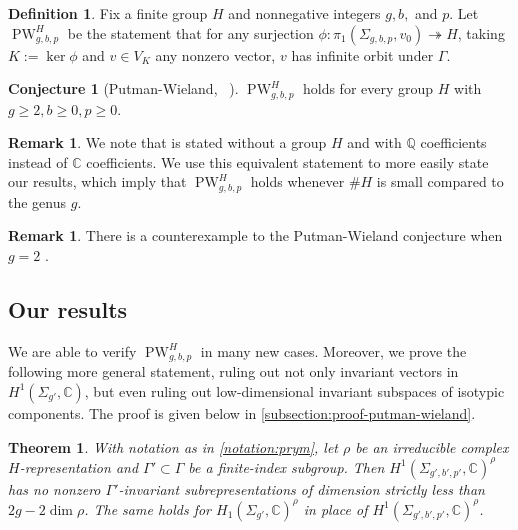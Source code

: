 \documentclass[12 pt]{amsart}
\theoremstyle{plain}
\newtheorem{theorem}[subsubsection]{Theorem}
\theoremstyle{definition}
\newtheorem{definition}[subsubsection]{Definition}
\newtheorem{remark}[subsubsection]{Remark}
\newtheorem{conjecture}[subsubsection]{Conjecture}
\theoremstyle{remark}
\numberwithin{equation}{section}
\DeclareMathOperator\PW{PW}
\begin{document}
\begin{definition}
	\label{definition:pw}
	Fix a finite group $H$ and nonnegative integers $g, b,$ and $p$.
	Let $\PW_{g,b,p}^H$ be the statement that for any
	surjection $\phi: \pi_1(\Sigma_{g,b,p}, v_0) \twoheadrightarrow
	H$, taking $K := \ker \phi$ and $v \in V_K$ any nonzero vector,
	$v$ has infinite orbit under $\Gamma$.
\end{definition}

\begin{conjecture}[Putman-Wieland, ~]
	\label{conjecture:putman-wieland}
	$\PW_{g,b,p}^H$ holds for every group $H$ with $g \geq 2, b \geq 0, p \geq 0$.
\end{conjecture}

\begin{remark}
\label{remark:putman-wieland-differences}
We note that 
\cite[Conjecture 1.2]{putmanW:abelian-quotients}
is stated without a group $H$ and with $\mathbb Q$ coefficients instead of
$\mathbb C$ coefficients.
We use this equivalent statement to more easily state our results,
which imply that 
$\PW_{g,b,p}^H$ holds whenever $\# H$ is small compared to the genus $g$. 
\end{remark}
\begin{remark}
	\label{remark:}
	There is a counterexample to the Putman-Wieland conjecture when $g = 2$ \cite[Theorem 1.3]{markovic}.
\end{remark}


\subsection{Our results}

We are able to verify $\PW_{g,b,p}^H$ in many new cases.
Moreover, we prove the following more general statement, ruling out
not only invariant vectors in $H^1(\Sigma_{g'}, \mathbb C)$, but even ruling out low-dimensional invariant subspaces
of isotypic components.
The proof is given below in \autoref{subsection:proof-putman-wieland}.
\begin{theorem}
	\label{theorem:asymptotic-putman-wieland}
	With notation as in \autoref{notation:prym}, let $\rho$ be an irreducible
	complex $H$-representation and $\Gamma' \subset \Gamma$ be a finite-index subgroup. Then
	$H^1(\Sigma_{g',b',p'},\mathbb C)^\rho$
	has no nonzero $\Gamma'$-invariant subrepresentations 
	of dimension strictly less than $2g - 2\dim \rho$.
	The same holds for
	$H_1(\Sigma_{g'},\mathbb C)^\rho$ in place of 
	$H^1(\Sigma_{g',b',p'},\mathbb C)^\rho$.
\end{theorem}
\end{document}
